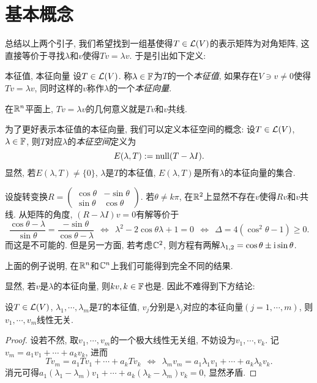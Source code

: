 \section{基本概念}

总结以上两个引子, 我们希望找到一组基使得$T \in \mathcal{L} (V)$的表示矩阵为对角矩阵, 这直接等价于寻找$\lambda$和$v$使得$Tv=\lambda v$. 于是引出如下定义: 

\begin{definition}{本征值, 本征向量}
	设$T \in \mathcal{L} (V)$. 称$\lambda \in \mathbb{F}$为$T$的一个\textit{本征值}, 如果存在$V \ni v \neq 0$使得$Tv = \lambda v$, 同时这样的$v$称作$\lambda $的一个\textit{本征向量}. 
\end{definition}

在$\mathbb{R} ^n$平面上, $Tv=\lambda v$的几何意义就是$Tv$和$v$共线. 

为了更好表示本征值的本征向量, 我们可以定义本征空间的概念: 设$T \in \mathcal{L} (V)$, $\lambda \in \mathbb{F}$, 则$T$对应$\lambda$的\textit{本征空间}定义为$$E(\lambda ,T):= \operatorname{null} (T-\lambda I).$$
显然, 若$E(\lambda ,T) \neq \{ 0 \}$, $\lambda$是$T$的本征值, $E(\lambda ,T)$是所有$\lambda$的本征向量的集合. 

\begin{example}
	设旋转变换$R = \begin{pmatrix}
 \cos \theta & -\sin \theta \\
 \sin \theta & \cos \theta
\end{pmatrix}$. 若$\theta \neq k\pi$, 在$\mathbb{R} ^2$上显然不存在$v$使得$Rv$和$v$共线. 从矩阵的角度, $(R-\lambda I)v=0$有解等价于$$\frac{\cos \theta - \lambda}{\sin \theta} = \frac{-\sin \theta}{\cos \theta - \lambda} ~~\Leftrightarrow ~~\lambda ^2 - 2\cos \theta \lambda + 1 = 0~~\Leftrightarrow ~~\Delta = 4(\cos ^2 \theta - 1) \geq 0. $$
而这是不可能的. 但是另一方面, 若考虑$\mathbb{C} ^2$, 则方程有两解$\lambda _{1,2} = \cos \theta \pm \operatorname{i} \sin \theta$. 
\end{example}

上面的例子说明, 在$\mathbb{R} ^n$和$\mathbb{C} ^n$上我们可能得到完全不同的结果. 

显然, 若$v$是$\lambda$的本征向量, 则$kv,k \in \mathbb{F}$也是. 因此不难得到下方结论: 

\begin{proposition}{}
	设$T \in \mathcal{L} (V)$, $\lambda _1, \cdots ,\lambda _m$是$T$的本征值, $v_j$分别是$\lambda _j$对应的本征向量$(j=1,\cdots ,m)$, 则$v_1, \cdots ,v_m$线性无关. 
\end{proposition}
\begin{proof}
	设若不然, 取$v_1,\cdots ,v_m$的一个极大线性无关组, 不妨设为$v_1,\cdots ,v_k$. 记$v_m = a_1v_1 + \cdots + a_kv_k$, 进而$$Tv_m = a_1Tv_1 + \cdots + a_kTv_k ~~\Leftrightarrow ~~\lambda _mv_m = a_1\lambda _1v_1 + \cdots + a_k\lambda _kv_k.$$
	消元可得$a_1(\lambda _1-\lambda _m)v_1 + \cdots + a_k(\lambda _k-\lambda _m)v_k = 0$, 显然矛盾. 
\end{proof}

